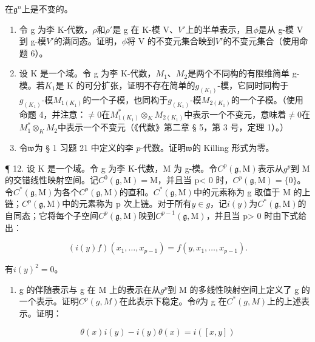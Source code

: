 在\(\mathfrak{g}^n\)上是不变的。

\begin{enumerate}
\def\labelenumi{\arabic{enumi}.}
\setcounter{enumi}{8}
\item
  令 g 为李 K-代数，\(\rho\)和\(\rho'\)是 g 在 K-模 V、\(V'\)上的半单表示，且\(\phi\)是从 g-模 V 到 g-模\(V'\)的满同态。证明，\(\phi\)将 V 的不变元集合映到\(V'\)的不变元集合（使用命题 6）。
\item
  设 K 是一个域。令 g 为李 K-代数，\(M_{1}\)、\(M_{2}\)是两个不同构的有限维简单 g-模。若\(K_{1}\)是 K 的可分扩张，证明不存在简单的\(g_{(K_{1})}\)-模，它同时同构于\(g_{(K_{1})}\)-模\(M_{1(K_{1})}\)的一个子模，也同构于\(g_{(K_{1})}\)-模\(M_{2(K_{1})}\)的一个子模。（使用命题 4，并注意：\(\neq0\)在\(M_{1(K_{1})}^{*}\otimes_{K}M_{2(K_{1})}\)中表示一个不变元，意味着\(\neq0\)在\(M_{1}^{*}\otimes_{K}M_{2}\)中表示一个不变元（《代数》第二章 § 5，第 3 号，定理 1）。）
\item
  令\(\mathfrak{w}\)为 § 1 习题 21 中定义的李 \(p\)-代数。证明\(\mathfrak{w}\)的 Killing 形式为零。
\end{enumerate}

¶ 12. 设 K 是一个域。令 g 为李 K-代数，M 为 g-模。令\(C^{p}(\mathfrak{g}, \mathrm{M})\)表示从\(g^{p}\)到 M 的交错线性映射空间。记\(C^{0}(\mathfrak{g}, \mathrm{M}) = \mathrm{M}\)，并且当 p\textless{} 0 时，\(C^{p}(\mathfrak{g}, \mathrm{M}) = \{0\}\)。令\(C^{*}(\mathfrak{g}, \mathrm{M})\)为各个\(C^{p}(\mathfrak{g}, \mathrm{M})\)的直和。\(C^{*}(\mathfrak{g}, \mathrm{M})\)中的元素称为 g 取值于 M 的上链；\(C^{p}(\mathfrak{g}, \mathrm{M})\)中的元素称为 p 次上链。对于所有\(y \in g\)，记\(i(y)\)为\(C^{*}(\mathfrak{g}, \mathrm{M})\)的自同态；它将每个子空间\(C^{p}(\mathfrak{g}, \mathrm{M})\)映到\(C^{p-1}(\mathfrak{g}, \mathrm{M})\)，并且当 p\textgreater{} 0 时由下式给出：

\[
(i (y) f) \left(x _ {1}, \dots , x _ {p - 1}\right) = f \left(y, x _ {1}, \dots , x _ {p - 1}\right).\tag{1}
\]

有\(i(y)^{2}=0\)。

\begin{enumerate}
\def\labelenumi{(\alph{enumi})}
\tightlist
\item
  g 的伴随表示与 g 在 M 上的表示在从\(g^{p}\)到 M 的多线性映射空间上定义了 g 的一个表示。证明\(C^{p}(g, M)\)在此表示下稳定。令\(\theta\)为 g 在\(C^{*}(g, M)\)上的上述表示。证明：
\end{enumerate}

\[
\theta (x) i (y) - i (y) \theta (x) = i ([ x, y ])
\]

